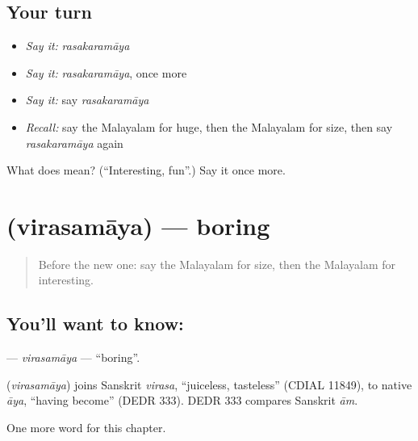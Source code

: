 \subsection*{Your turn}
\begin{itemize}
\raggedright
  \item \emph{Say it:} \emph{rasakaramāya}
  \item \emph{Say it:} \emph{rasakaramāya}, once more
  \item \emph{Say it:} say \emph{rasakaramāya}
  \item \emph{Recall:} say the Malayalam for huge, then the Malayalam for size, then say \emph{rasakaramāya} again
\end{itemize}

\begin{tcolorbox}[breakable,colback=teal!4,colframe=teal!35!black,title={Before you move on}]
What does  mean? (\textquotedblleft{}Interesting, fun\textquotedblright{}.) Say it once more.
\end{tcolorbox}
\section[\texorpdfstring{\ml{വിരസമായ} (virasamāya)}{വിരസമായ (virasamāya)}]{ (virasamāya) — boring}

\label{lesson:ML-C284-virasamaya}



\begin{quote}
Before the new one: say the Malayalam for size, then the Malayalam for interesting.
\end{quote}

\subsection*{You'll want to know: }
\textbf{} — \emph{virasamāya} — \textquotedblleft{}boring\textquotedblright{}.

\begin{cousinweb}
\textbf{} (\emph{virasamāya}) joins Sanskrit \emph{virasa}, \textquotedblleft{}juiceless, tasteless\textquotedblright{} (CDIAL 11849), to native \emph{āya}, \textquotedblleft{}having become\textquotedblright{} (DEDR 333). DEDR 333 compares Sanskrit \emph{ām}.
\end{cousinweb}

\begin{grammarlens}[title={What you've built}]
One more word for this chapter.
\end{grammarlens}

